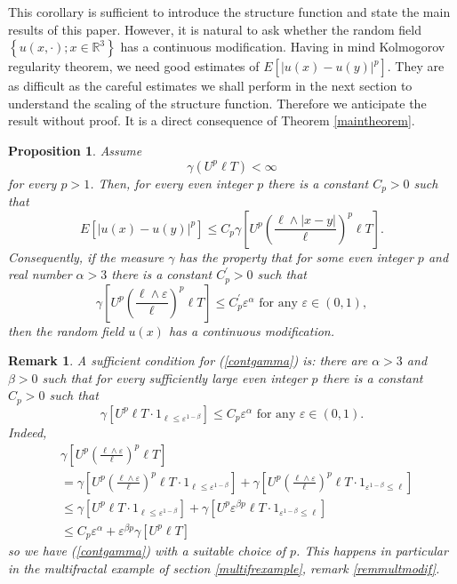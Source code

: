 \documentclass[a4paper,12pt]{article}
\newtheorem{proposition}{Proposition}
\newtheorem{remark}{Remark}
\begin{document}
This corollary is sufficient to introduce the structure function and state the
main results of this paper. However, it is natural to ask whether the random
field $\left\{  u(x,\cdot);x\in\mathbb{R}^{3}\right\}  $ has a continuous
modification. Having in mind Kolmogorov regularity theorem, we need good
estimates of $E\left[  \left|  u(x)-u(y)\right|  ^{p}\right]  $. They are as
difficult as the careful estimates we shall perform in the next section to
understand the scaling of the structure function. Therefore we anticipate the
result without proof. It is a direct consequence of Theorem \ref{maintheorem}.

\begin{proposition}
Assume
\[
\gamma(U^{p}\ell T)<\infty
\]
for every $p>1$. Then, for every even integer $p$ there is a constant
$C_{p}>0$ such that
\[
E\left[  \left|  u(x)-u(y)\right|  ^{p}\right]  \leq C_{p}\gamma\left[
U^{p}\left(  \frac{\ell\wedge\left|  x-y\right|  }{\ell}\right)  ^{p}\ell
T\right]  .
\]
Consequently, if the measure $\gamma$ has the property that for some even
integer $p$ and real number $\alpha>3$ there is a constant $C_{p}^{\prime}>0$
such that
\begin{equation}
\gamma\left[  U^{p}\left(  \frac{\ell\wedge\varepsilon}{\ell}\right)  ^{p}\ell
T\right]  \leq C_{p}^{\prime}\varepsilon^{\alpha}\text{ for any }%
\varepsilon\in\left(  0,1\right)  , \label{contgamma}%
\end{equation}
then the random field $u(x)$ has a continuous modification.
\end{proposition}

\begin{remark}
\label{remregularity}A sufficient condition for (\ref{contgamma}) is: there
are $\alpha>3$ and $\beta>0$ such that for every sufficiently large even
integer $p$ there is a constant $C_{p}>0$ such that
\[
\gamma\left[  U^{p}\ell T\cdot1_{\ell\leq\varepsilon^{1-\beta}}\right]  \leq
C_{p}\varepsilon^{\alpha}\text{ for any }\varepsilon\in\left(  0,1\right)  .
\]
Indeed,
\begin{align*}
&  \gamma\left[  U^{p}\left(  \frac{\ell\wedge\varepsilon}{\ell}\right)
^{p}\ell T\right] \\
&  =\gamma\left[  U^{p}\left(  \frac{\ell\wedge\varepsilon}{\ell}\right)
^{p}\ell T\cdot1_{\ell\leq\varepsilon^{1-\beta}}\right]  +\gamma\left[
U^{p}\left(  \frac{\ell\wedge\varepsilon}{\ell}\right)  ^{p}\ell
T\cdot1_{\varepsilon^{1-\beta}\leq\ell}\right] \\
&  \leq\gamma\left[  U^{p}\ell T\cdot1_{\ell\leq\varepsilon^{1-\beta}}\right]
+\gamma\left[  U^{p}\varepsilon^{\beta p}\ell T\cdot1_{\varepsilon^{1-\beta
}\leq\ell}\right] \\
&  \leq C_{p}\varepsilon^{\alpha}+\varepsilon^{\beta p}\gamma\left[  U^{p}\ell
T\right]
\end{align*}
so we have (\ref{contgamma}) with a suitable choice of $p$. This happens in
particular in the multifractal example of section \ref{multifrexample}, remark
\ref{remmultmodif}.
\end{remark}
\end{document}

